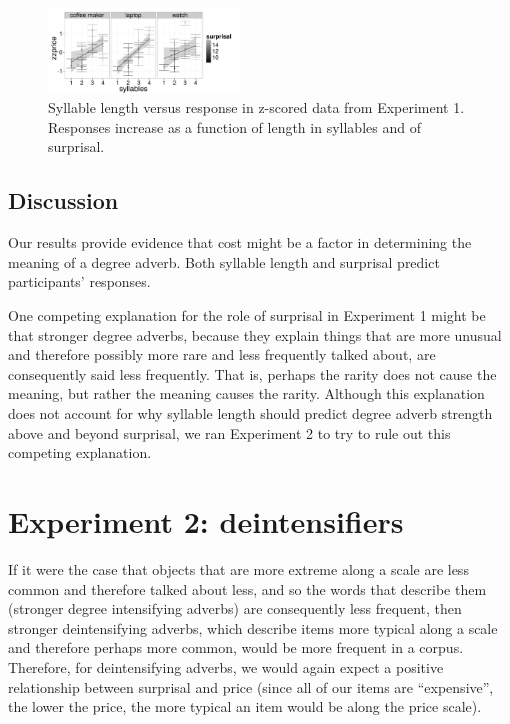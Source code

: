 \documentclass[10pt,letterpaper]{article}
\begin{document}
  \begin{figure}[ht]
  \begin{center}
  \includegraphics[width=0.45\textwidth]{exp1-zz-syllables.png}
  \end{center}
  \caption{Syllable length versus response in z-scored data from Experiment 1. Responses increase as a function of length in syllables and of surprisal.} 
  \label{scaled-figure}
  \end{figure}
  
  \subsection{Discussion}
  
  Our results provide evidence that cost might be a factor in determining the meaning of a degree adverb. Both syllable length and surprisal predict participants' responses.
  
  One competing explanation for the role of surprisal in Experiment 1 might be that stronger degree adverbs, because they explain things that are more unusual and therefore possibly more rare and less frequently talked about, are consequently said less frequently. That is, perhaps the rarity does not cause the meaning, but rather the meaning causes the rarity. Although this explanation does not account for why syllable length should predict degree adverb strength above and beyond surprisal, we ran Experiment 2 to try to rule out this competing explanation. 
  
\section{Experiment 2: deintensifiers}

  If it were the case that objects that are more extreme along a scale are less common and therefore talked about less, and so the words that describe them (stronger degree intensifying adverbs) are consequently less frequent, then stronger deintensifying adverbs, which describe items more typical along a scale and therefore perhaps more common, would be more frequent in a corpus. Therefore, for deintensifying adverbs, we would again expect a positive relationship between surprisal and price (since all of our items are ``expensive'', the lower the price, the more typical an item would be along the price scale).
  
\end{document}

